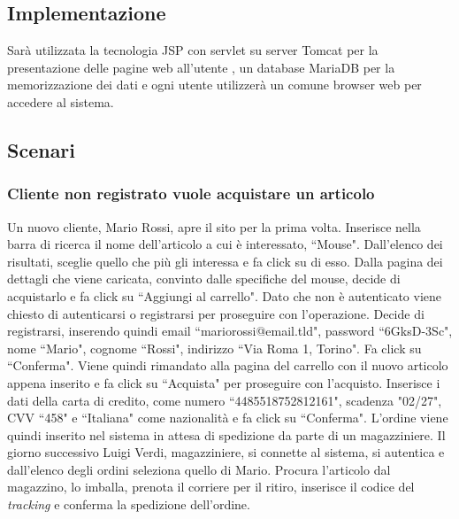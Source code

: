 \documentclass[12pt]{article}
\begin{document}
\subsection{Implementazione}
Sarà utilizzata la tecnologia JSP con servlet su server Tomcat per la presentazione delle pagine web all'utente , un database MariaDB per la memorizzazione dei dati e ogni utente utilizzerà un comune browser web per accedere al sistema.

\newpage
\subsection{Scenari}
\subsubsection{Cliente non registrato vuole acquistare un articolo}
Un nuovo cliente, Mario Rossi, apre il sito per la prima volta.
Inserisce nella barra di ricerca il nome dell'articolo a cui è interessato, ``Mouse".
Dall'elenco dei risultati, sceglie quello che più gli interessa e fa click su di esso.
Dalla pagina dei dettagli che viene caricata, convinto dalle specifiche del mouse, decide di acquistarlo e fa click su ``Aggiungi al carrello".
Dato che non è autenticato viene chiesto di autenticarsi o registrarsi per proseguire con l'operazione.
Decide di registrarsi, inserendo quindi email ``mariorossi@email.tld", password ``6GksD-3Sc", nome ``Mario", cognome ``Rossi", indirizzo ``Via Roma 1, Torino". Fa click su ``Conferma".
Viene quindi rimandato alla pagina del carrello con il nuovo articolo appena inserito e fa click su ``Acquista" per proseguire con l'acquisto.
Inserisce i dati della carta di credito, come numero  ``4485518752812161", scadenza "02/27", CVV ``458" e ``Italiana" come nazionalità e fa click su ``Conferma".
L'ordine viene quindi inserito nel sistema in attesa di spedizione da parte di un magazziniere.
Il giorno successivo Luigi Verdi, magazziniere, si connette al sistema, si autentica e dall'elenco degli ordini seleziona quello di Mario. Procura l'articolo dal magazzino, lo imballa, prenota il corriere per il ritiro, inserisce il codice del \emph{tracking} e conferma la spedizione dell'ordine.
\end{document}
